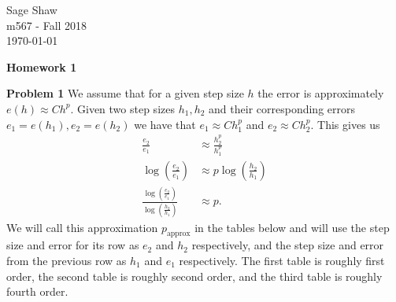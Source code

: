 \documentclass[12pt]{article}
\newcommand{\problem}[1]{\hspace{-4 ex} \large \textbf{Problem #1} }
\begin{document}
	\thispagestyle{empty}
	
	\begin{flushright}
		Sage Shaw \\
		m567 - Fall 2018 \\
		\today
	\end{flushright}
	
\begin{center}{\large \textbf{Homework 1}}\end{center}
\bigbreak

\hspace{-.5 ex}\problem{1} We assume that for a given step size $h$ the error is approximately $e(h) \approx Ch^p$. Given two step sizes $h_1, h_2$ and their corresponding errors $e_1=e(h_1), e_2=e(h_2)$ we have that $e_1 \approx Ch_1^p$ and $e_2 \approx Ch_2^p$. This gives us
\begin{align*}
	\frac{e_2}{e_1} &\approx \frac{h_2^p}{h_1^p} \\
	\log \left( \frac{e_2}{e_1} \right) &\approx p\log \left( \frac{h_2}{h_1} \right) \\
	\frac{\log \left( \frac{e_2}{e_1} \right) }{\log \left( \frac{h_2}{h_1} \right)} &\approx p \text{.}
\end{align*}
We will call this approximation $p_\text{approx}$ in the tables below and will use the step size and error for its row as $e_2$ and $h_2$ respectively, and the step size and error from the previous row as $h_1$ and $e_1$ respectively. The first table is roughly first order, the second table is roughly second order, and the third table is roughly fourth order.
\end{document}
